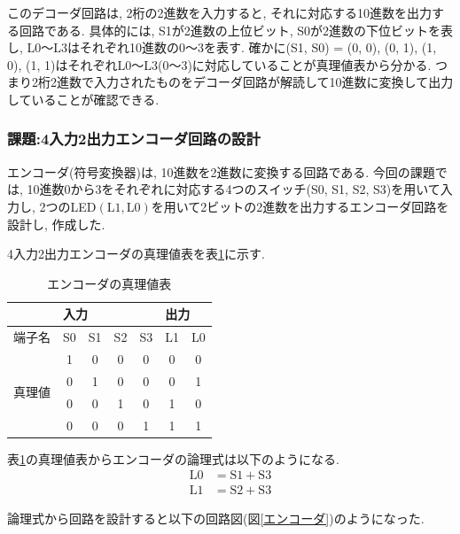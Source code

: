 \documentclass[a4paper, 11pt, uplatex]{jsarticle}
\begin{document}
このデコーダ回路は, 2桁の2進数を入力すると,  それに対応する10進数を出力する回路である.
具体的には,  S1が2進数の上位ビット,  S0が2進数の下位ビットを表し,  L0〜L3はそれぞれ10進数の0〜3を表す.
確かに(S1, S0) = (0, 0), (0, 1), (1, 0), (1, 1)はそれぞれL0〜L3(0〜3)に対応していることが真理値表から分かる.
つまり2桁2進数で入力されたものをデコーダ回路が解読して10進数に変換して出力していることが確認できる.

\subsubsection{課題:4入力2出力エンコーダ回路の設計}
エンコーダ(符号変換器)は,  10進数を2進数に変換する回路である.
今回の課題では,  10進数0から3をそれぞれに対応する4つのスイッチ(S0, S1, S2, S3)を用いて入力し,
2つのLED$(\mathrm{L1} ,  \mathrm{L0})$を用いて2ビットの2進数を出力するエンコーダ回路を設計し,  作成した.

\par
4入力2出力エンコーダの真理値表を表\ref{エンコーダ真理値表}に示す.
\begin{table}[H]
  \begin{center}
  \caption{エンコーダの真理値表}
  \label{エンコーダ真理値表}
\begin{tabular}{|c|c|c|c|c|c|c|}
\hline
                    & \multicolumn{4}{l|}{入力} & \multicolumn{2}{l|}{出力} \\ \hline
端子名                &S0 & S1 &S2 &S3 &L1 &L0  \\ \hline \hline
\multirow{4}{*}{真理値} & 1 & 0 &0 &0 &0 &0 \\
                     & 0 & 1 &0 &0 &0 &1 \\
                     & 0 & 0 &1 &0 &1 &0 \\
                     & 0 & 0 &0 &1 &1 &1 \\ \hline
\end{tabular}
\end{center}
\end{table}

表\ref{エンコーダ真理値表}の真理値表からエンコーダの論理式は以下のようになる.
\begin{align}
  \mathrm{L0} &= \mathrm{S1} + \mathrm{S3} \\
  \mathrm{L1} &= \mathrm{S2} + \mathrm{S3}
\end{align}

論理式から回路を設計すると以下の回路図(図\ref{エンコーダ})のようになった.
\end{document}
